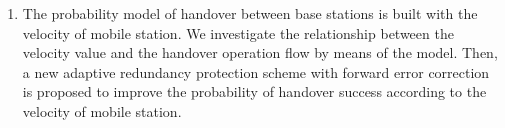 {\begin{enumerate}[(1)]
    \item The probability model of handover between base stations is built with the velocity of mobile station. We investigate the relationship between the velocity value and the handover operation flow by means of the model. Then, a new adaptive  redundancy protection scheme with forward error correction is proposed to improve the probability of handover success according to the velocity of mobile station.
\end{enumerate}

}

